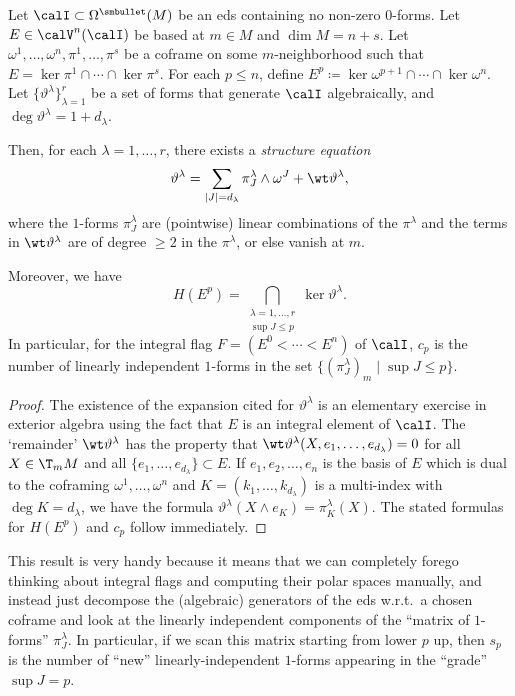 \begin{prop}\label{prop III.1.15 Bryant}
    Let $\calI\subset\Omega^{\smbullet}(M)$ be an \gls{eds} containing no non-zero $0$-forms. Let $E\in\calV^n(\calI)$ be based at $m\in M$ and $\dim M=n+s$. Let $\omega^1,\ldots,\omega^n,\pi^1,\ldots,\pi^s$ be a coframe on some $m$-neighborhood such that $E=\ker\pi^1\cap\cdots\cap\ker\pi^s$. For each $p\leq n$, define $E^p\coloneqq \ker\omega^{p+1}\cap\cdots\cap \ker\omega^n$. Let $\{\vartheta^\lambda\}_{\lambda=1}^r$ be a set of forms that generate $\calI$ algebraically, and $\deg \vartheta^\lambda=1+d_\lambda$.

    Then, for each $\lambda=1,\ldots,r$, there exists a \emph{structure equation}
    \[\vartheta^\lambda=\sum_{|J|=d_\lambda}\pi_J^\lambda\wedge\omega^J+\wt\vartheta^\lambda,\label{eq prop III.1.15 Bryant}\]
    where the $1$-forms $\pi_J^\lambda$ are (pointwise) linear combinations of the $\pi^\lambda$ and the terms in $\wt\vartheta^\lambda$ are of degree $\geq 2$ in the $\pi^\lambda$, or else vanish at $m$.

    Moreover, we have 
    \[H(E^p)=\bigcap_{\begin{smallmatrix}
        \lambda=1,\ldots,r\\
        \sup J\leq p
    \end{smallmatrix}}\ker\vartheta^\lambda.\label{eq flag}\]
    In particular, for the integral flag $F=(E^0<\cdots<E^n)$ of $\calI$, $c_p$ is the number of linearly independent $1$-forms in the set $\{(\pi_J^\lambda)_m\mid \sup J\leq p\}$.
\end{prop}
\begin{proof}
    The existence of the expansion cited for $\vartheta^\lambda$ is an elementary exercise in exterior algebra using the fact that $E$ is an integral element of $\calI$. The `remainder' $\wt\vartheta^\lambda$ has the property that $\wt\vartheta^\lambda(X,e_1,\ldots,e_{d_\lambda})=0$ for all $X\in\T_m M$ and all $\{e_1,\ldots,e_{d_\lambda}\}\subset E$. If $e_1,e_2,\ldots,e_n$ is the basis of $E$ which is dual to the coframing $\omega^1,\ldots,\omega^n$ and $K=(k_1,\ldots,k_{d_\lambda})$ is a multi-index with $\deg K=d_\lambda$, we have the formula $\vartheta^\lambda(X\wedge e_K)=\pi^\lambda_K(X)$. The stated formulas for $H(E^p)$ and $c_p$ follow immediately.
\end{proof}

This result is very handy because it means that we can completely forego thinking about integral flags and computing their polar spaces manually, and instead just decompose the (algebraic) generators of the \gls{eds} w.r.t.\ a chosen coframe and look at the linearly independent components of the ``matrix of $1$-forms'' $\pi^\lambda_J$. In particular, if we scan this matrix starting from lower $p$ up, then $s_p$ is the number of ``new'' linearly-independent $1$-forms appearing in the ``grade'' $\sup J=p$.









